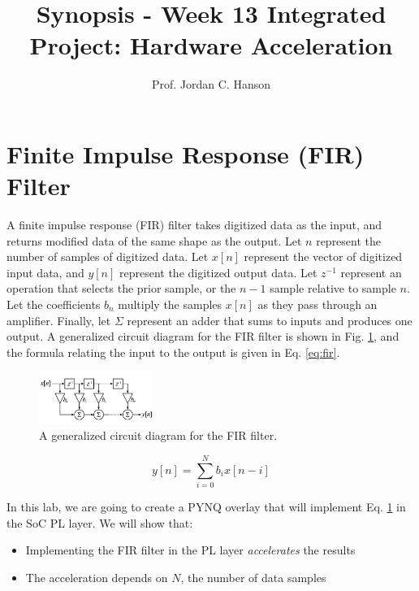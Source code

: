 \documentclass{article}
\begin{document}
\title{Synopsis - Week 13 Integrated Project: Hardware Acceleration}
\author{Prof. Jordan C. Hanson}

\maketitle

\section{Finite Impulse Response (FIR) Filter}

\noindent
A finite impulse response (FIR) filter takes digitized data as the input, and returns modified data of the same shape as the output.  Let $n$ represent the number of samples of digitized data.  Let $x[n]$ represent the vector of digitized input data, and $y[n]$ represent the digitized output data.  Let $z^{-1}$ represent an operation that selects the prior sample, or the $n-1$ sample relative to sample $n$.  Let the coefficients $b_n$ multiply the samples $x[n]$ as they pass through an amplifier.  Finally, let $\Sigma$ represent an adder that sums to inputs and produces one output.  A generalized circuit diagram for the FIR filter is shown in Fig. \ref{fig:fir}, and the formula relating the input to the output is given in Eq. \ref{eq:fir}.

\begin{figure}[ht]
\centering
\includegraphics[width=0.33\textwidth]{figures/FIR_Filter.png}
\caption{\label{fig:fir} A generalized circuit diagram for the FIR filter.}
\end{figure}

\begin{equation}
y[n] = \sum_{i=0}^N b_i x[n-i]
\label{eq:fir}
\end{equation}

\noindent
In this lab, we are going to create a PYNQ overlay that will implement Eq. \ref{fig:fir} in the SoC PL layer.  We will show that:

\begin{itemize}
\item Implementing the FIR filter in the PL layer \textit{accelerates} the results
\item The acceleration depends on $N$, the number of data samples
\end{itemize}
\end{document}
